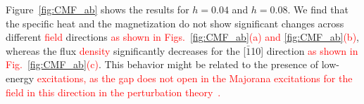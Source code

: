 \documentclass[twocolumn,superscriptaddress,showpacs, longbibliography, aps, prb]{revtex4-2}
\newcommand{\red}[1]{\textcolor{red}{#1}}
\begin{document}
Figure~\ref{fig:CMF_ab} shows the results for  $h=0.04$ and $h=0.08$. 
We find that the specific heat and the magnetization do
not show significant changes %
across different \red{field} directions \red{as shown in Figs.~\ref{fig:CMF_ab}(a) and \ref{fig:CMF_ab}(b)}, %
whereas the flux \red{density} significantly decreases
for the [$\bar{1}$10] direction \red{as shown in Fig.~\ref{fig:CMF_ab}(c)}. This behavior 
might be related to the presence of low-energy %
\red{excitations, as the gap does not open in the Majorana excitations for the field in this direction in the perturbation theory~\cite{Kitaev2006}.} %
\end{document}

